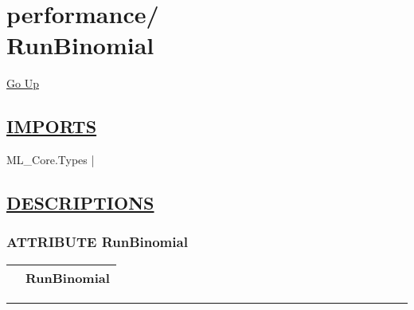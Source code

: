 \chapter*{\color{headfile}
{\large performance\slash\hspace{0pt}}
 \\
RunBinomial
}
\hypertarget{ecldoc:toc:performance.RunBinomial}{}
\hyperlink{ecldoc:toc:root/performance}{Go Up}

\section*{\underline{\textsf{IMPORTS}}}
\begin{doublespace}
{\large
ML\_Core.Types |
}
\end{doublespace}

\section*{\underline{\textsf{DESCRIPTIONS}}}
\subsection*{\textsf{\colorbox{headtoc}{\color{white} ATTRIBUTE}
RunBinomial}}

\hypertarget{ecldoc:performance.runbinomial}{}

{\renewcommand{\arraystretch}{1.5}
\begin{tabularx}{\textwidth}{|>{\raggedright\arraybackslash}l|X|}
\hline
\hspace{0pt}\mytexttt{\color{red} } & \textbf{RunBinomial} \\
\hline
\end{tabularx}
}

\par


\rule{\linewidth}{0.5pt}
